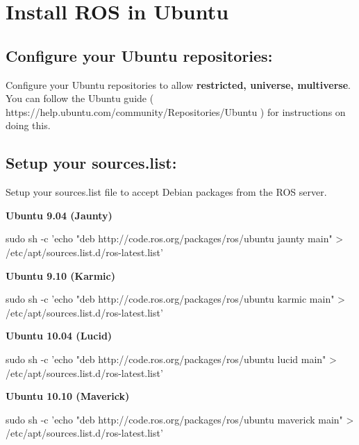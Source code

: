 \chapter{Install ROS in Ubuntu}

\section{Configure your Ubuntu repositories:}

Configure your Ubuntu repositories to allow {\bfseries restricted, universe, multiverse}. You can follow the Ubuntu guide ( https://help.ubuntu.com/community/Repositories/Ubuntu ) for instructions on doing this.

\section{Setup your sources.list:}


Setup your sources.list file to accept Debian packages from the ROS server.  
\newline

{\hspace{2em}\bfseries Ubuntu 9.04 (Jaunty)}

\hspace{4em}
sudo sh -c 'echo "deb http://code.ros.org/packages/ros/ubuntu jaunty main" > /etc/apt/sources.list.d/ros-latest.list'
\newline
 
{\hspace{2em}\bfseries Ubuntu 9.10 (Karmic)}

\hspace{4em}
sudo sh -c 'echo "deb http://code.ros.org/packages/ros/ubuntu karmic main" > /etc/apt/sources.list.d/ros-latest.list'
\newline

{\hspace{2em}\bfseries Ubuntu 10.04 (Lucid)}

\hspace{4em}
sudo sh -c 'echo "deb http://code.ros.org/packages/ros/ubuntu lucid main" > /etc/apt/sources.list.d/ros-latest.list'
\newline

{\hspace{2em}\bfseries Ubuntu 10.10 (Maverick)}

\hspace{4em}
sudo sh -c 'echo "deb http://code.ros.org/packages/ros/ubuntu maverick main" > /etc/apt/sources.list.d/ros-latest.list'
\newline

